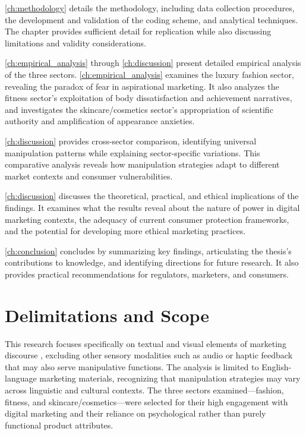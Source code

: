 \autoref{ch:methodology} details the methodology, including data collection procedures, the development and validation of the coding scheme, and analytical techniques. The chapter provides sufficient detail for replication while also discussing limitations and validity considerations.

\autoref{ch:empirical_analysis} through \autoref{ch:discussion} present detailed empirical analysis of the three sectors. \autoref{ch:empirical_analysis} examines the luxury fashion sector, revealing the paradox of fear in aspirational marketing. It also analyzes the fitness sector's exploitation of body dissatisfaction and achievement narratives, and investigates the skincare/cosmetics sector's appropriation of scientific authority and amplification of appearance anxieties.

\autoref{ch:discussion} provides cross-sector comparison, identifying universal manipulation patterns while explaining sector-specific variations. This comparative analysis reveals how manipulation strategies adapt to different market contexts and consumer vulnerabilities.

\autoref{ch:discussion} discusses the theoretical, practical, and ethical implications of the findings. It examines what the results reveal about the nature of power in digital marketing contexts, the adequacy of current consumer protection frameworks, and the potential for developing more ethical marketing practices.

\autoref{ch:conclusion} concludes by summarizing key findings, articulating the thesis's contributions to knowledge, and identifying directions for future research. It also provides practical recommendations for regulators, marketers, and consumers.

\section{Delimitations and Scope}
\label{sec:delimitations}

This research focuses specifically on textual and visual elements of marketing discourse \cite{fairclough2015language}, excluding other sensory modalities such as audio or haptic feedback that may also serve manipulative functions. The analysis is limited to English-language marketing materials, recognizing that manipulation strategies may vary across linguistic and cultural contexts. The three sectors examined—fashion, fitness, and skincare/cosmetics—were selected for their high engagement with digital marketing and their reliance on psychological rather than purely functional product attributes.

